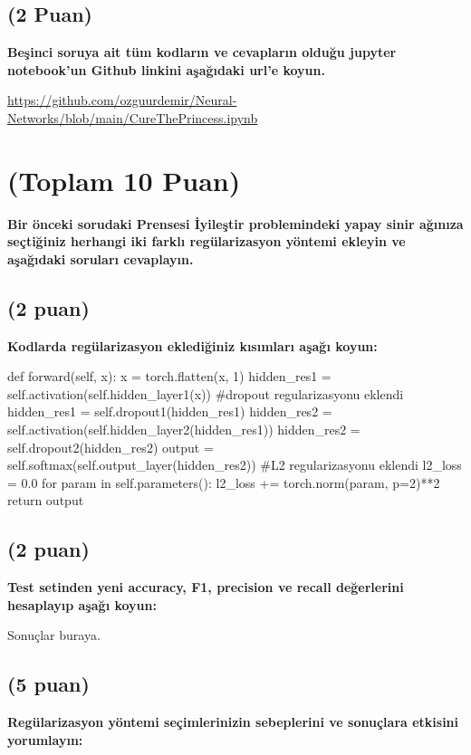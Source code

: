 \documentclass[11pt]{article}
\begin{document}
\subsection{(2 Puan)} \textbf{Beşinci soruya ait tüm kodların ve cevapların olduğu jupyter notebook'un Github linkini aşağıdaki url'e koyun.}

\url{https://github.com/ozguurdemir/Neural-Networks/blob/main/CureThePrincess.ipynb}

\section{(Toplam 10 Puan)} \textbf{Bir önceki sorudaki Prensesi İyileştir problemindeki yapay sinir ağınıza seçtiğiniz herhangi iki farklı regülarizasyon yöntemi ekleyin ve aşağıdaki soruları cevaplayın.} 

\subsection{(2 puan)} \textbf{Kodlarda regülarizasyon eklediğiniz kısımları aşağı koyun:} 

\begin{python}
def forward(self, x):
        x = torch.flatten(x, 1)
        hidden_res1 = self.activation(self.hidden_layer1(x))
        #dropout regularizasyonu eklendi
        hidden_res1 = self.dropout1(hidden_res1)
        hidden_res2 = self.activation(self.hidden_layer2(hidden_res1))
        hidden_res2 = self.dropout2(hidden_res2)
        output = self.softmax(self.output_layer(hidden_res2))
        #L2 regularizasyonu eklendi
        l2_loss = 0.0
        for param in self.parameters():
            l2_loss += torch.norm(param, p=2)**2
        return output


        
\end{python}

\subsection{(2 puan)} \textbf{Test setinden yeni accuracy, F1, precision ve recall değerlerini hesaplayıp aşağı koyun:}

Sonuçlar buraya.

\subsection{(5 puan)} \textbf{Regülarizasyon yöntemi seçimlerinizin sebeplerini ve sonuçlara etkisini yorumlayın:}
\end{document}

